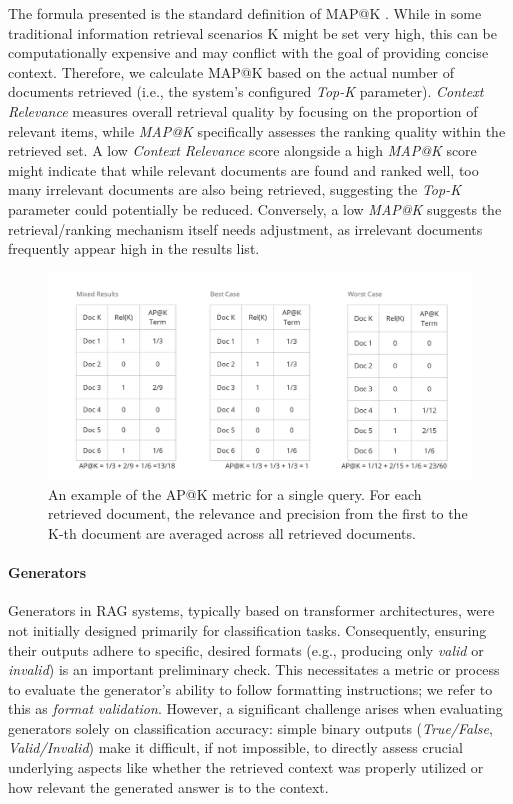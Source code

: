 The formula presented is the standard definition of MAP@K \cite{Lin.13.10.2020}. While in some traditional information retrieval scenarios K might be set very high, this can be computationally expensive and may conflict with the goal of providing concise context. Therefore, we calculate MAP@K based on the actual number of documents retrieved (i.e., the system's configured \textit{Top-K} parameter). \textit{Context Relevance} measures overall retrieval quality by focusing on the proportion of relevant items, while \textit{MAP@K} specifically assesses the ranking quality within the retrieved set. A low \textit{Context Relevance} score alongside a high \textit{MAP@K} score might indicate that while relevant documents are found and ranked well, too many irrelevant documents are also being retrieved, suggesting the \textit{Top-K} parameter could potentially be reduced. Conversely, a low \textit{MAP@K} suggests the retrieval/ranking mechanism itself needs adjustment, as irrelevant documents frequently appear high in the results list.

\begin{figure}[!ht]
  \centering
  \includegraphics[width=\textwidth]{images/APatK.pdf}
  \caption{An example of the AP@K metric for a single query. For each retrieved document, the relevance and precision from the first to the K-th document are averaged across all retrieved documents.}
  \label{fig:APatK}
\end{figure}


\paragraph{Generators}
Generators in RAG systems, typically based on transformer architectures, were not initially designed primarily for classification tasks. Consequently, ensuring their outputs adhere to specific, desired formats (e.g., producing only \textit{valid} or \textit{invalid}) is an important preliminary check. This necessitates a metric or process to evaluate the generator's ability to follow formatting instructions; we refer to this as \textit{format validation}. However, a significant challenge arises when evaluating generators solely on classification accuracy: simple binary outputs (\textit{True/False}, \textit{Valid/Invalid}) make it difficult, if not impossible, to directly assess crucial underlying aspects like whether the retrieved context was properly utilized or how relevant the generated answer is to the context.

